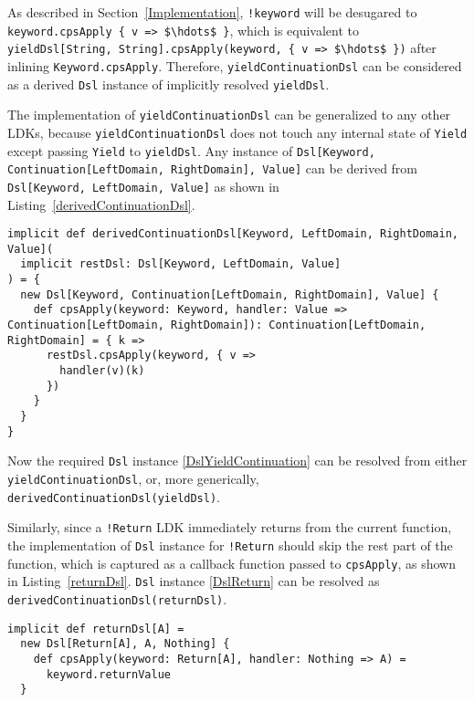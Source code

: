 As described in Section~\ref{Implementation}, \lstinline{!keyword} will be desugared to \lstinline[mathescape=true]|keyword.cpsApply { v => $\hdots$ }|, which is equivalent to \lstinline[mathescape=true]|yieldDsl[String, String].cpsApply(keyword, { v => $\hdots$ })| after inlining \lstinline{Keyword.cpsApply}. Therefore, \lstinline{yieldContinuationDsl} can be considered as a derived \lstinline{Dsl} instance of implicitly resolved \lstinline{yieldDsl}.

The implementation of \lstinline{yieldContinuationDsl} can be generalized to any other LDKs, because \lstinline{yieldContinuationDsl} does not touch any internal state of \lstinline{Yield} except passing \lstinline{Yield} to \lstinline{yieldDsl}. Any instance of \lstinline{Dsl[Keyword, Continuation[LeftDomain, RightDomain], Value]} can be derived from \lstinline{Dsl[Keyword, LeftDomain, Value]} as shown in Listing~\ref{derivedContinuationDsl}.

\begin{lstlisting}[caption={The generic derived \lstinline{Dsl} instance for any LDK, which can be used in a \lstinline{Continuation}},label={derivedContinuationDsl}]
implicit def derivedContinuationDsl[Keyword, LeftDomain, RightDomain, Value](
  implicit restDsl: Dsl[Keyword, LeftDomain, Value]
) = {
  new Dsl[Keyword, Continuation[LeftDomain, RightDomain], Value] {
    def cpsApply(keyword: Keyword, handler: Value => Continuation[LeftDomain, RightDomain]): Continuation[LeftDomain, RightDomain] = { k =>
      restDsl.cpsApply(keyword, { v =>
        handler(v)(k)
      })
    }
  }
}
\end{lstlisting}

Now the required \lstinline{Dsl} instance \ref{DslYieldContinuation} can be resolved from either \lstinline{yieldContinuationDsl}, or, more generically, \lstinline{derivedContinuationDsl(yieldDsl)}.


Similarly, since a \lstinline{!Return} LDK immediately returns from the current function, the implementation of \lstinline{Dsl} instance for \lstinline{!Return} should skip the rest part of the function, which is captured as a callback function passed to \lstinline{cpsApply}, as shown in Listing~\ref{returnDsl}. \lstinline{Dsl} instance \ref{DslReturn} can be resolved as \lstinline{derivedContinuationDsl(returnDsl)}.

\begin{lstlisting}[caption={The \lstinline{Dsl} instance of \lstinline{Return} LDK, to skip the registered callback function},label={returnDsl}]
implicit def returnDsl[A] =
  new Dsl[Return[A], A, Nothing] {
    def cpsApply(keyword: Return[A], handler: Nothing => A) =
      keyword.returnValue
  }
\end{lstlisting}

